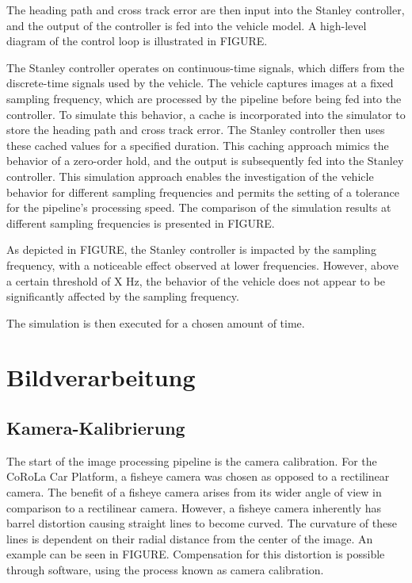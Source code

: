 \documentclass[arbeit=studie,oneside,BCOR=12mm]{ArbeitRST}
\begin{document}
The heading path and cross track error are then input into the Stanley
controller, and the output of the controller is fed into the vehicle model. A
high-level diagram of the control loop is illustrated in FIGURE.

The Stanley controller operates on continuous-time signals, which differs from
the discrete-time signals used by the vehicle. The vehicle captures images at a
fixed sampling frequency, which are processed by the pipeline before being fed
into the controller. To simulate this behavior, a cache is incorporated into
the simulator to store the heading path and cross track error. The Stanley
controller then uses these cached values for a specified duration. This caching
approach mimics the behavior of a zero-order hold, and the output is
subsequently fed into the Stanley controller. This simulation approach enables
the investigation of the vehicle behavior for different sampling frequencies
and permits the setting of a tolerance for the pipeline's processing speed. The
comparison of the simulation results at different sampling frequencies is
presented in FIGURE.

As depicted in FIGURE, the Stanley controller is impacted by the sampling
frequency, with a noticeable effect observed at lower frequencies. However,
above a certain threshold of X Hz, the behavior of the vehicle does not appear
to be significantly affected by the sampling frequency.

The simulation is then executed for a chosen amount of time. 

\chapter{Bildverarbeitung} 

\section{Kamera-Kalibrierung} 

The start of the image processing pipeline is the camera calibration. For the
CoRoLa Car Platform, a fisheye camera was chosen as opposed to a rectilinear
camera. The benefit of a fisheye camera arises from its wider angle of view in
comparison to a rectilinear camera. However, a fisheye camera inherently has
barrel distortion causing straight lines to become curved. The curvature of
these lines is dependent on their radial distance from the center of
the image. An example can be seen in FIGURE. Compensation for this distortion
is possible through software, using the process known as camera calibration. 
\end{document}
